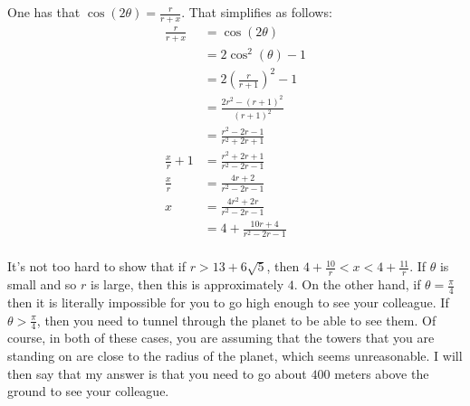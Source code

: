 \documentclass[11pt]{article}
\theoremstyle{definition}
\begin{document}
One has that $\cos(2\theta) = \frac{r}{r+x}$.  That simplifies as follows:
\begin{align*}
\frac{r}{r+x} & = \cos(2\theta) \\
& = 2\cos^2(\theta) - 1 \\
& = 2\left(\frac{r}{r+1}\right)^2 - 1 \\
& = \frac{2r^2 - (r+1)^2}{(r+1)^2} \\
& = \frac{r^2 - 2r -1}{r^2 + 2r + 1} \\
\frac{x}{r} + 1 & = \frac{r^2 + 2r + 1}{r^2 - 2r - 1} \\
\frac{x}{r} & = \frac{4r + 2}{r^2 - 2r - 1} \\
x & = \frac{4r^2 + 2r}{r^2 - 2r - 1} \\
& = 4 + \frac{10r + 4}{r^2 - 2r - 1} \\
\end{align*}

It's not too hard to show that if $r > 13 + 6\sqrt{5}$, then $4 + \frac{10}{r} < x < 4 + \frac{11}{r}$.  If $\theta$ is small and so $r$ is large, then this is approximately $4$.  On the other hand, if $\theta = \frac{\pi}{4}$ then it is literally impossible for you to go high enough to see your colleague.  If $\theta > \frac{\pi}{4}$, then you need to tunnel through the planet to be able to see them.  Of course, in both of these cases, you are assuming that the towers that you are standing on are close to the radius of the planet, which seems unreasonable.  I will then say that my answer is that you need to go about $400$ meters above the ground to see your colleague.
\end{document}
